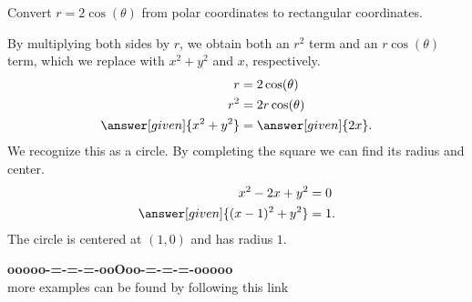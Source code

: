 \documentclass{ximera}
\begin{document}
\begin{example}
   Convert $r =2\cos(\theta)$ from polar coordinates to rectangular
   coordinates.        	
   \begin{explanation}
     By multiplying both sides by $r$, we obtain both an $r^2$ term
     and an $r\cos(\theta)$ term, which we replace with $x^2+y^2$ and
     $x$, respectively.
     \begin{align*}
       r &=2\cos(\theta) \\
       r^2 &= 2r\cos(\theta) \\
       \answer[given]{x^2+y^2} &= \answer[given]{2x}. 
     \end{align*}
     We recognize this as a circle. By completing the square we can
     find its radius and center.
     \begin{align*}
       x^2-2x+y^2 &= 0 \\
       \answer[given]{(x-1)^2 + y^2} &=1.
     \end{align*}
     The circle is centered at $(1,0)$ and has radius $1$.
   \end{explanation}
 \end{example}
















\begin{center}
\textbf{\textcolor{green!50!black}{ooooo-=-=-=-ooOoo-=-=-=-ooooo}} \\

more examples can be found by following this link\\ 

\end{center}
\end{document}
